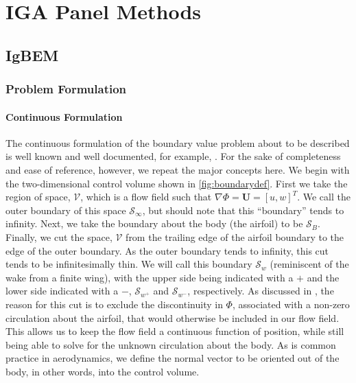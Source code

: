 


	
\chapter*{IGA Panel Methods}
\label{ch:igapanel}

\section{IgBEM}
\label{sec:igbem}

\subsection{Problem Formulation}
\label{ssec:probform}

\subsubsection{Continuous Formulation}
\label{sssec:contform}

The continuous formulation of the boundary value problem about to be described is well known and well documented, for example, \cite{moran1984, Kostas2017Shape-optimizat, Politis2014}. For the sake of completeness and ease of reference, however, we repeat the major concepts here. We begin with the two-dimensional control volume shown in \cref{fig:boundarydef}. First we take the region of space, \( \mathscr{V} \), which is a flow field such that \( \nabla \Phi = \mathbf{U} = [u, w]^T\). We call the outer boundary of this space \( \mathcal{S}_{\infty} \), but should note that this ``boundary'' tends to infinity. Next, we take the boundary about the body (the airfoil) to be \( \mathcal{S}_B \). Finally, we cut the space, \( \mathscr{V} \) from the trailing edge of the airfoil boundary to the edge of the outer boundary. As the outer boundary tends to infinity, this cut tends to be infinitesimally thin. We will call this boundary \( \mathcal{S}_w \) (reminiscent of the wake from a finite wing), with the upper side being indicated with a \(+\) and the lower side indicated with a \(-\), \( \mathcal{S}_{w^+} \) and \( \mathcal{S}_{w^-} \), respectively. As discussed in \cite{moran1984}, the reason for this cut is to exclude the discontinuity in \( \Phi \), associated with a non-zero circulation about the airfoil, that would otherwise be included in our flow field. This allows us to keep the flow field a continuous function of position, while still being able to solve for the unknown circulation about the body. As is common practice in aerodynamics, we define the normal vector to be oriented out of the body, in other words, into the control volume.

